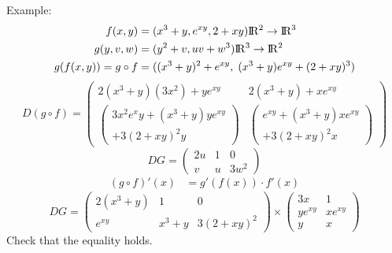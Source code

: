 \documentclass{article}
\newcommand{\R}{\rm I\!R}
\begin{document}
        Example:
        \begin{align}
            f(x,y) &= (x^3 + y, e^{xy}, 2+xy) \R^2\rightarrow\R^3\\
            g(y,v,w) &= (y^2+v,uv+w^3) \R^3\rightarrow\R^2\\
            g(f(x,y)) = g\circ f &= ((x^3+y)^2+e^{xy},\;(x^3+y)e^{xy}+(2+xy)^3)
        \end{align}
        \begin{equation}
            D(g\circ f) = \begin{pmatrix}
                2(x^3+y)(3x^2) + ye^{xy}                &   2(x^3+y)+xe^{xy} \\
                \begin{pmatrix}
                    3x^2e^xy+(x^3 + y)ye^{xy}\\+3(2+xy)^2y
                \end{pmatrix}    &   
                \begin{pmatrix}
                    e^{xy}+(x^3+y)xe^{xy}\\+3(2+xy)^2x
                \end{pmatrix}
            \end{pmatrix}
        \end{equation}
        \begin{equation}
            DG = \begin{pmatrix}
                2u  &   1   &   0\\
                v   &   u   &   3w^2
            \end{pmatrix}
        \end{equation}
        \begin{align}
            (g\circ f)'(x) &= g'(f(x))\cdot f'(x)
        \end{align}
        \begin{equation}
            DG = \begin{pmatrix}
                2(x^3+y)  &   1       &   0\\
                e^{xy}    &   x^3+y   &   3(2+xy)^2
            \end{pmatrix}\times
            \begin{pmatrix}
                3x      &   1\\
                ye^{xy} &   xe^{xy}\\
                y       &   x
            \end{pmatrix}
        \end{equation}
        Check that the equality holds.
\end{document}
